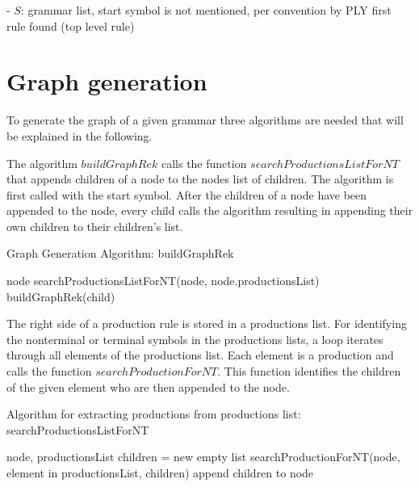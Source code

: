 - $S$: grammar list, start symbol is not mentioned, per convention by \ac{PLY} first rule found (top level rule)


                
                
                
\section{Graph generation}\label{sec:ImplementationGraphGeneration}

To generate the graph of a given grammar three algorithms are needed that will be explained in the following. 

The algorithm $buildGraphRek$ calls the function $searchProductionsListForNT$ that appends children of a node to the nodes list of children. The algorithm is first called with the start symbol. 
After the children of a node have been appended to the node, every child calls the algorithm resulting in appending their own children to their children's list. 

\begin{algorithm}[H]
\caption{Graph Generation Algorithm: buildGraphRek}
\begin{algorithmic}[1] 
\Require node
\State searchProductionsListForNT(node, node.productionsList)
		\State buildGraphRek(child)
	\EndFor
\EndIf
\end{algorithmic}
\end{algorithm}

The right side of a production rule is stored in a productions list. For identifying the nonterminal or terminal symbols in the productions lists, a loop iterates through all elements of the productions list. Each element is a production and calls the function $searchProductionForNT$. This function identifies the children of the given element who are then appended to the node.

\begin{algorithm}[H]
\caption{Algorithm for extracting productions from productions list: searchProductionsListForNT}
\begin{algorithmic}[1] 
\Require node, productionsList
	\State children = new empty list
	\State searchProductionForNT(node, element in productionsList, children)
	\State append children to node
\EndFor
\end{algorithmic}
\end{algorithm}

